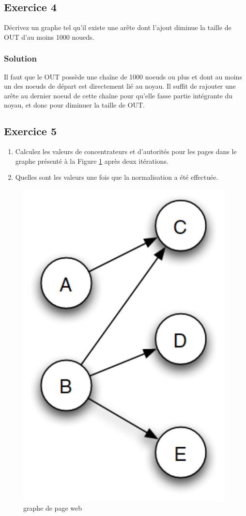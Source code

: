 \subsection*{Exercice 4}
Décrivez un graphe tel qu'il existe une arête dont l'ajout diminue la taille de OUT d'au moins 1000 noueds.

    \subsubsection*{Solution}
    Il faut que le OUT possède une chaîne de 1000 noeuds ou plus et dont au moins un des noeuds de départ est directement lié au noyau.
    Il suffit de rajouter une arête au dernier noeud de cette chaîne pour qu'elle fasse partie intégrante du noyau, et donc pour diminuer la taille de OUT.

\subsection*{Exercice 5}
	\begin{enumerate}
	\item Calculez les valeurs de concentrateurs et d'autorités pour les pages dans le graphe présenté à la Figure \ref{fig:auth} après deux itérations.
	\item Quelles sont les valeurs une fois que la normalisation a été effectuée.
\end{enumerate}

\begin{figure}[!h]
	\centering
	\includegraphics[scale=0.4]{figs/auth-hub.png}
	\caption{graphe de page web}
	\label{fig:auth}
\end{figure}

